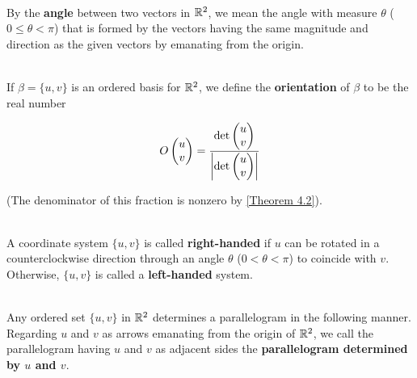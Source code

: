 \begin{definition}
	\hfill\\
	By the \textbf{angle} between two vectors in $\mathbb{R}^2$, we mean the angle with measure $\theta$ ($0 \leq \theta < \pi$) that is formed by the vectors having the same magnitude and direction as the given vectors by emanating from the origin.
\end{definition}

\begin{definition}
	\hfill\\
	If $\beta = \{u,v\}$ is an ordered basis for $\mathbb{R}^2$, we define the \textbf{orientation} of $\beta$ to be the real number

	\[O\begin{pmatrix}
			u \\ v
		\end{pmatrix} = \frac{\det\begin{pmatrix}
				u \\ v
			\end{pmatrix}}{\left\lvert \det\begin{pmatrix}
					u \\ v
				\end{pmatrix} \right\rvert}\]

	(The denominator of this fraction is nonzero by \autoref{Theorem 4.2}).
\end{definition}

\begin{definition}
	\hfill\\
	A coordinate system $\{u, v\}$ is called \textbf{right-handed} if $u$ can be rotated in a counterclockwise direction through an angle $\theta$ ($0 < \theta < \pi$) to coincide with $v$. Otherwise, $\{u ,v\}$ is called a \textbf{left-handed} system.
\end{definition}

\begin{definition}
	\hfill\\
	Any ordered set $\{u, v\}$ in $\mathbb{R}^2$ determines a parallelogram in the following manner. Regarding $u$ and $v$ as arrows emanating from the origin of $\mathbb{R}^2$, we call the parallelogram having $u$ and $v$ as adjacent sides the \textbf{parallelogram determined by $u$ and $v$}.
\end{definition}

